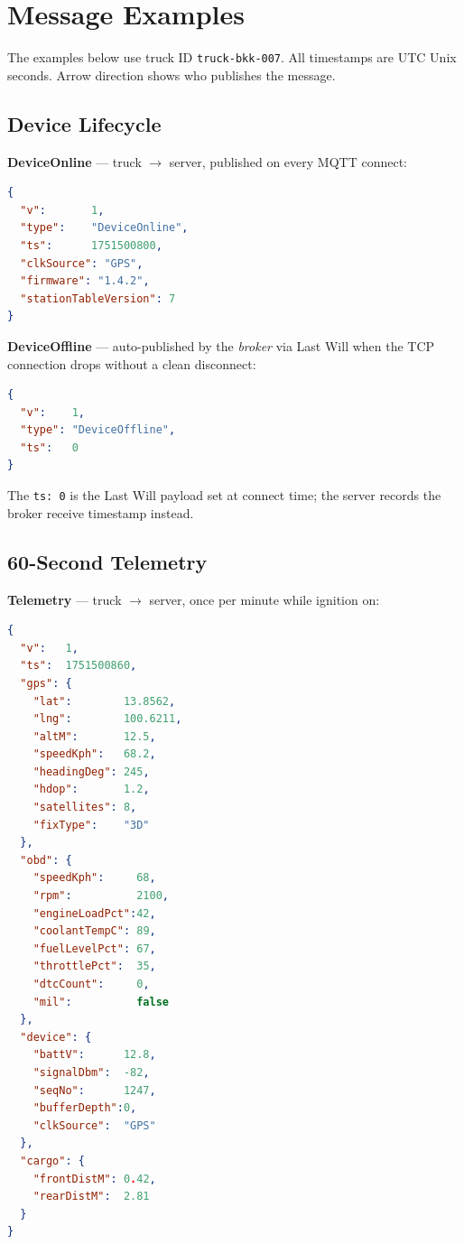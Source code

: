 \documentclass{article}
\begin{document}
\section{Message Examples}
\label{sec:msg-examples}

The examples below use truck ID \texttt{truck-bkk-007}. All timestamps are
UTC Unix seconds. Arrow direction shows who publishes the message.

\subsection{Device Lifecycle}

\textbf{DeviceOnline} --- truck $\to$ server, published on every MQTT connect:

\begin{lstlisting}[language=json, caption=Topic: trucks/truck-bkk-007/event | QoS 1]
{
  "v":       1,
  "type":    "DeviceOnline",
  "ts":      1751500800,
  "clkSource": "GPS",
  "firmware": "1.4.2",
  "stationTableVersion": 7
}
\end{lstlisting}

\textbf{DeviceOffline} --- auto-published by the \emph{broker} via Last Will
when the TCP connection drops without a clean disconnect:

\begin{lstlisting}[language=json, caption=Topic: trucks/truck-bkk-007/event | QoS 1 | retain: true]
{
  "v":    1,
  "type": "DeviceOffline",
  "ts":   0
}
\end{lstlisting}

\noindent The \texttt{ts: 0} is the Last Will payload set at connect time;
the server records the broker receive timestamp instead.

\subsection{60-Second Telemetry}

\textbf{Telemetry} --- truck $\to$ server, once per minute while ignition on:

\begin{lstlisting}[language=json, caption=Topic: trucks/truck-bkk-007/telemetry | QoS 1]
{
  "v":   1,
  "ts":  1751500860,
  "gps": {
    "lat":        13.8562,
    "lng":        100.6211,
    "altM":       12.5,
    "speedKph":   68.2,
    "headingDeg": 245,
    "hdop":       1.2,
    "satellites": 8,
    "fixType":    "3D"
  },
  "obd": {
    "speedKph":     68,
    "rpm":          2100,
    "engineLoadPct":42,
    "coolantTempC": 89,
    "fuelLevelPct": 67,
    "throttlePct":  35,
    "dtcCount":     0,
    "mil":          false
  },
  "device": {
    "battV":      12.8,
    "signalDbm":  -82,
    "seqNo":      1247,
    "bufferDepth":0,
    "clkSource":  "GPS"
  },
  "cargo": {
    "frontDistM": 0.42,
    "rearDistM":  2.81
  }
}
\end{lstlisting}
\end{document}
